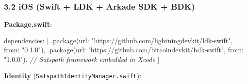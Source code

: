 \documentclass[
]{article}
\newenvironment{Shaded}{}{}
\newcommand{\CommentTok}[1]{\textcolor[rgb]{0.38,0.63,0.69}{\textit{#1}}}
\newcommand{\NormalTok}[1]{#1}
\newcommand{\OperatorTok}[1]{\textcolor[rgb]{0.40,0.40,0.40}{#1}}
\newcommand{\StringTok}[1]{\textcolor[rgb]{0.25,0.44,0.63}{#1}}
\begin{document}
\hypertarget{ios-swift-ldk-arkade-sdk-bdk}{%
\subsubsection{3.2 iOS (Swift + LDK + Arkade SDK +
BDK)}\label{ios-swift-ldk-arkade-sdk-bdk}}

\textbf{Package.swift}:

\begin{Shaded}
\begin{Highlighting}[]
\NormalTok{dependencies}\OperatorTok{:} \OperatorTok{[}
    \OperatorTok{.}\NormalTok{package}\OperatorTok{(}\NormalTok{url}\OperatorTok{:} \StringTok{"https://github.com/lightningdevkit/ldk{-}swift"}\OperatorTok{,}\NormalTok{ from}\OperatorTok{:} \StringTok{"0.1.0"}\OperatorTok{),}
    \OperatorTok{.}\NormalTok{package}\OperatorTok{(}\NormalTok{url}\OperatorTok{:} \StringTok{"https://github.com/bitcoindevkit/bdk{-}swift"}\OperatorTok{,}\NormalTok{ from}\OperatorTok{:} \StringTok{"1.0.0"}\OperatorTok{),}
    \CommentTok{// Satspath framework embedded in Xcode}
\OperatorTok{]}
\end{Highlighting}
\end{Shaded}

\textbf{Identity} (\texttt{SatspathIdentityManager.swift}):
\end{document}
